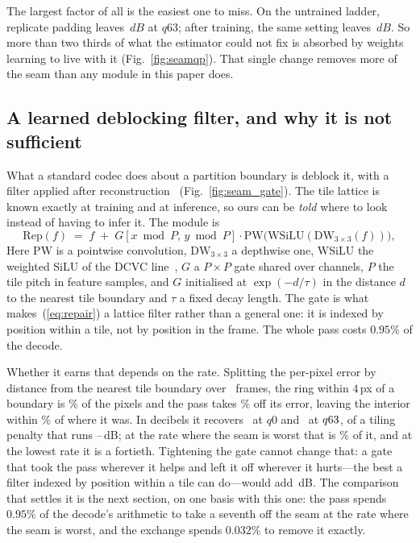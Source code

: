 \documentclass[10pt,twocolumn,letterpaper]{article}
\newcommand{\dB}{\,dB}
\begin{document}
\begin{table}[t]
\centering

\caption{\textbf{Tile size}, dB at $q63$. Doubling the side roughly halves the
penalty, as~(\ref{eq:contam}) predicts, and costs no computation.}
\label{tab:tilesize}
\end{table}

The largest factor of all is the easiest one to miss. On the untrained ladder,
replicate padding leaves \SeamReplHigh$\dB$ at $q63$; after training, the same
setting leaves \FloorHigh$\dB$. So more than two thirds of what the
estimator could not fix is absorbed by weights learning to live with it
(Fig.~\ref{fig:seamqp}). That single change removes more of the seam than any
module in this paper does.

\subsection{A learned deblocking filter, and why it is not sufficient}

What a standard codec does about a partition boundary is deblock it, with a
filter applied after reconstruction~\cite{hevc,vvc} (Fig.~\ref{fig:seam_gate}). The tile lattice is known
exactly at training and at inference, so ours can be \emph{told} where to look
instead of having to infer it. The module is
\begin{equation}
\mathrm{Rep}(f) \;=\; f \;+\; G[x \bmod P,\, y \bmod P]\cdot
\mathrm{PW}\bigl(\mathrm{WSiLU}(\mathrm{DW}_{3\times3}(f))\bigr),
\label{eq:repair}
\end{equation}
Here $\mathrm{PW}$ is a
pointwise convolution, $\mathrm{DW}_{3\times3}$ a depthwise one,
$\mathrm{WSiLU}$ the weighted SiLU of the DCVC line~\cite{dcvcrt}, $G$ a
$P{\times}P$ gate shared over channels, $P$ the tile pitch in feature samples,
and $G$ initialised at $\exp(-d/\tau)$ in the distance $d$ to the nearest tile
boundary and $\tau$ a fixed decay length. The gate is what makes~(\ref{eq:repair}) a lattice filter rather than a general
one: it is indexed by position within a tile, not by position in the frame. The whole pass costs $0.95\%$ of the
decode.

Whether it earns that depends on the rate. Splitting the per-pixel error by
distance from the nearest tile boundary over \SeamRingFrames\ frames, the ring
within $4$\,px of a boundary is \SeamRingPct\% of the pixels and the pass takes
\SeamRingGainPct\% off its error, leaving the interior within
\SeamInteriorPct\% of where it was. In decibels it recovers \SeamRecovLo\ at
$q0$ and \SeamRecovHi\ at $q63$, of a tiling penalty that runs
\SeamPenaltyLo--\SeamPenaltyHi\dB; at the rate where the seam is worst that is
\SeamRecovShareHi\% of it, and at the lowest rate it is a fortieth. Tightening
the gate cannot change that: a gate that took the pass wherever it helps and
left it off wherever it hurts---the best a filter indexed by position within a
tile can do---would add \SeamPerfectExtra\dB. The comparison that settles it is
the next section, on one basis with this one: the pass spends $0.95\%$ of the
decode's arithmetic to take a seventh off the seam at the rate where the seam is
worst, and the exchange spends $0.032\%$ to remove it exactly.
\end{document}

